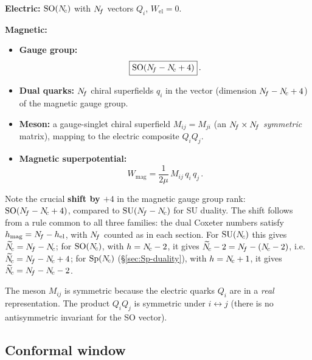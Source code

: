 \documentclass[11pt,a4paper]{article}
\newcommand{\SO}[1]{\mathrm{SO}(#1)}
\newcommand{\Sp}[1]{\mathrm{Sp}(#1)}
\newcommand{\Nctilde}{\widetilde{N}_{\!c}}
\begin{document}
\begin{tcolorbox}[
  enhanced,
  colback=blue!5!white,
  colframe=blue!70!black,
  fonttitle=\bfseries\large,
  title={Intriligator--Seiberg Duality for $\SO{\Nc}$},
  breakable
]
\textbf{Electric:} $\SO{\Nc}$ with $N_{\!f}$ vectors $Q_i$, \quad
$W_{\text{el}} = 0$.

\medskip

\textbf{Magnetic:}
\begin{itemize}
  \item \textbf{Gauge group:}
    \begin{equation}\label{eq:SO-dual}
      \boxed{\SO{\Nf - \Nc + 4}}\,.
    \end{equation}
  \item \textbf{Dual quarks:} $N_{\!f}$ chiral superfields $q_i$ in the
    vector (dimension $N_{\!f} - N_{\!c} + 4$) of the magnetic gauge group.
  \item \textbf{Meson:} a gauge-singlet chiral superfield
    $M_{ij} = M_{ji}$ (an $N_{\!f} \times N_{\!f}$ \emph{symmetric} matrix),
    mapping to the electric composite $Q_i Q_j$.
  \item \textbf{Magnetic superpotential:}
    \begin{equation}\label{eq:SO-Wmag}
      W_{\text{mag}} = \frac{1}{2\mu}\, M_{ij}\, q_i\, q_j\,.
    \end{equation}
\end{itemize}
\end{tcolorbox}

Note the crucial \textbf{shift by $+4$} in the magnetic gauge group
rank: $\SO{\Nf - \Nc + 4}$, compared to $\mathrm{SU}(N_{\!f} - N_{\!c})$ for SU
duality.  The shift follows from a rule common to all three families:
the dual Coxeter numbers satisfy $h_{\text{mag}} = N_{\!f} - h_{\text{el}}$,
with $N_{\!f}$ counted as in each section.
For $\mathrm{SU}(N_{\!c})$ this gives $\Nctilde = \Nf - \Nc$; for $\SO{\Nc}$, with
$h = N_{\!c} - 2$, it gives $\Nctilde - 2 = \Nf - (\Nc - 2)$, i.e.\
$\Nctilde = \Nf - \Nc + 4$; for $\Sp{\Nc}$
(\S\ref{sec:Sp-duality}), with $h = N_{\!c} + 1$, it gives
$\Nctilde = \Nf - \Nc - 2$.

The meson $M_{ij}$ is symmetric because the electric quarks $Q_i$
are in a \emph{real} representation.  The product $Q_i Q_j$ is
symmetric under $i \leftrightarrow j$ (there is no antisymmetric
invariant for the SO vector).

\subsection{Conformal window}
\end{document}
